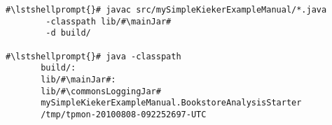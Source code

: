 \begin{lstlisting}[caption=Compile and run under Linux,label=lst:bookstoreAnalysisStarterLinux] 			
#\lstshellprompt{}# javac src/mySimpleKiekerExampleManual/*.java
        -classpath lib/#\mainJar#
        -d build/

#\lstshellprompt{}# java -classpath
       build/:
       lib/#\mainJar#:
       lib/#\commonsLoggingJar#
       mySimpleKiekerExampleManual.BookstoreAnalysisStarter 
       /tmp/tpmon-20100808-092252697-UTC
\end{lstlisting}	
